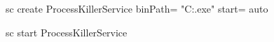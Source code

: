 sc create ProcessKillerService binPath= "C:\Path\To\ProcessKiller.exe" start= auto


sc start ProcessKillerService
